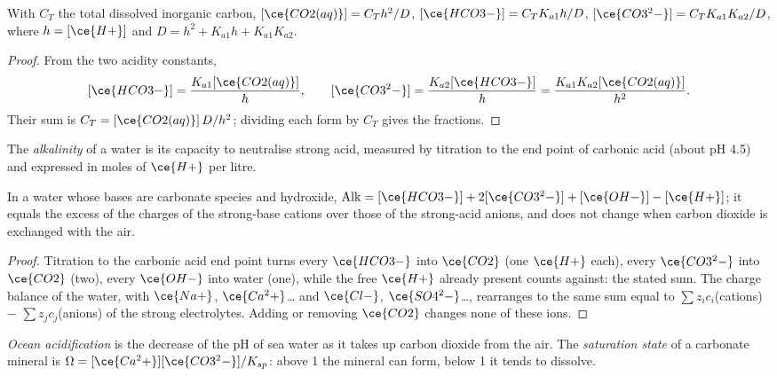 \begin{proposition}\label{prop:b3:environmental-toxicology:carbonate-fractions}
With $C_T$ the total dissolved inorganic carbon,
$[\ce{CO2(aq)}] = C_Th^2/D$, $[\ce{HCO3-}] = C_TK_{a1}h/D$, $[\ce{CO3^2-}] = C_TK_{a1}K_{a2}/D$, where $h = [\ce{H+}]$ and $D = h^2 + K_{a1}h + K_{a1}K_{a2}$.
\end{proposition}

\begin{proof}
From the two acidity constants,
\[
  [\ce{HCO3-}] = \frac{K_{a1}[\ce{CO2(aq)}]}{h}, \qquad [\ce{CO3^2-}] = \frac{K_{a2}[\ce{HCO3-}]}{h} = \frac{K_{a1}K_{a2}[\ce{CO2(aq)}]}{h^2}.
\]
Their sum is $C_T = [\ce{CO2(aq)}]\,D/h^2$; dividing each form by $C_T$ gives the fractions.
\end{proof}

\begin{definition}[Alkalinity]\label{def:b3:environmental-toxicology:alkalinity}
The \emph{alkalinity} of a water is its capacity to neutralise
strong acid, measured by titration to the end point of carbonic acid (about pH
4.5) and expressed in moles of $\ce{H+}$ per litre.
\end{definition}

\begin{proposition}\label{prop:b3:environmental-toxicology:alkalinity}
In a water whose bases are carbonate species and hydroxide,
$\mathrm{Alk} = [\ce{HCO3-}] + 2[\ce{CO3^2-}] + [\ce{OH-}] - [\ce{H+}]$; it equals the excess of the charges of the strong-base cations
over those of the strong-acid anions, and does not change when carbon dioxide
is exchanged with the air.
\end{proposition}

\begin{proof}
Titration to the carbonic acid end point turns every $\ce{HCO3-}$ into $\ce{CO2}$ (one $\ce{H+}$ each),
every $\ce{CO3^2-}$ into $\ce{CO2}$ (two), every $\ce{OH-}$ into water (one), while the free $\ce{H+}$ already present
counts against: the stated sum. The charge balance of the water, with
$\ce{Na+}$, $\ce{Ca^2+}$\dots{} and $\ce{Cl-}$, $\ce{SO4^2-}$\dots, rearranges to the same sum equal to $\sum z_i c_i$(cations) $-$ $\sum z_jc_j$(anions)
of the strong electrolytes. Adding or removing $\ce{CO2}$ changes none of these ions.
\end{proof}

\begin{definition}\label{def:b3:environmental-toxicology:acidification}
\emph{Ocean acidification} is the decrease of the
pH of sea water as it takes up carbon dioxide from the air. The \emph{saturation
state} of a carbonate mineral is
$\Omega = [\ce{Ca^2+}][\ce{CO3^2-}]/K_{sp}$: above 1 the mineral can form, below 1 it tends to dissolve.
\end{definition}

